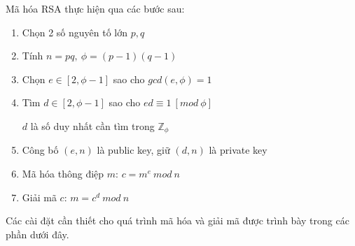 Mã hóa RSA thực hiện qua các bước sau:

\begin{enumerate}[ \indent{(}1{)} ]
        \item Chọn 2 số nguyên tố lớn $p,q$
        \item Tính $n=pq,\ \phi= (p-1)(q-1)$
        \item Chọn $e\in[2, \phi - 1]$ sao cho $gcd(e, \phi) = 1$
        \item Tìm $d \in [2, \phi - 1]$ sao cho $ed \equiv 1\ [mod\ \phi]$

        $d$ là số duy nhất cần tìm trong $\mathbb{Z}_{\phi}$
        \item Công bố $(e, n)$ là public key, giữ $(d, n)$ là private key
        \item Mã hóa thông điệp $m$: $c = m^e\ mod\ n$
        \item Giải mã $c$: $m = c^d\ mod\ n$
\end{enumerate}
Các cài đặt cần thiết cho quá trình mã hóa và giải mã được trình bày trong các phần dưới đây.